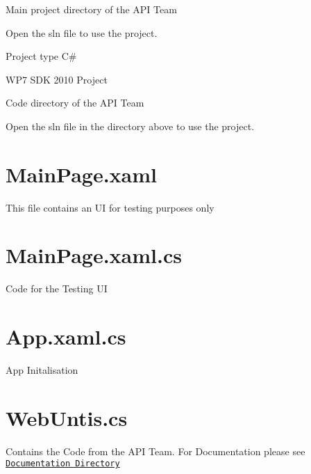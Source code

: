 Main project directory of the A\-P\-I Team

Open the sln file to use the project.


\begin{DoxyItemize}
\item Project type C\#
\item W\-P7 S\-D\-K 2010 Project
\end{DoxyItemize}

Code directory of the A\-P\-I Team

Open the sln file in the directory above to use the project.

\section*{Main\-Page.\-xaml}

This file contains an U\-I for testing purposes only \section*{Main\-Page.\-xaml.\-cs}

Code for the Testing U\-I \section*{App.\-xaml.\-cs}

App Initalisation \section*{Web\-Untis.\-cs}

Contains the Code from the A\-P\-I Team. For Documentation please see \href{https://github.com/florepos/HTL_WLA_WEBU/tree/master/Documentation/API-Team_Code-Documentation}{\tt Documentation Directory} 